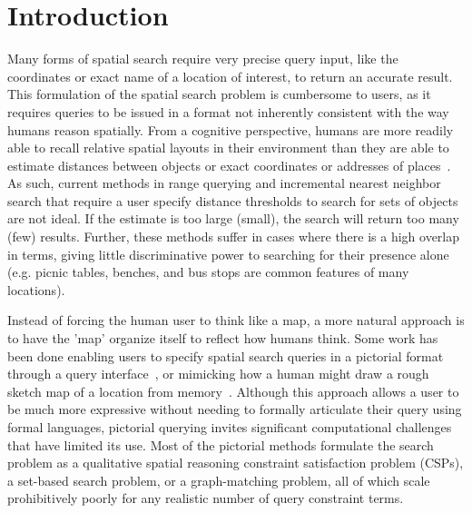 \section{Introduction}
\label{section:introduction}
\par{Many forms of spatial search require very precise query input, like the coordinates or exact name of a location of interest, to return an accurate result. 
This formulation of the spatial search problem is cumbersome to users, as it requires queries to be issued in a format not inherently consistent with the way humans reason spatially.
From a cognitive perspective, humans are more readily able to recall relative spatial layouts in their environment than they are able to estimate distances between objects or exact coordinates or addresses of places~\cite{Schwering2014, Weisberg2016, Miller2013, Keatley2021}.
As such, current methods in range querying and incremental nearest neighbor search that require a user specify distance thresholds to search for sets of objects are not ideal.
If the estimate is too large (small), the search will return too many (few) results. 
Further, these methods suffer in cases where there is a high overlap in terms, giving little discriminative power to searching for their presence alone (e.g. picnic tables, benches, and bus stops are common features of many locations). 
}
%
\par{Instead of forcing the human user to think like a map, a more natural approach is to have the 'map' organize itself to reflect how humans think. 
Some work has been done enabling users to specify spatial search queries in a pictorial format through a query interface~\cite{Soffer1997,DiLoreto1996}, or mimicking how a human might draw a rough sketch map of a location from memory~\cite{Schwering2014}.
Although this approach allows a user to be much more expressive without needing to formally articulate their query using formal languages, pictorial querying invites significant computational challenges that have limited its use. 
Most of the pictorial methods formulate the search problem as a qualitative spatial reasoning constraint satisfaction problem (CSPs), a set-based search problem, or a graph-matching problem, all of which scale prohibitively poorly for any realistic number of query constraint terms.
}

